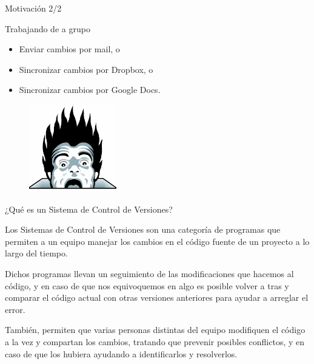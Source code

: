 \documentclass{beamer}
\begin{document}
\begin{frame}{Motivación 2/2}

    \begin{block}{Trabajando de a grupo}
        \begin{itemize}
            \item Enviar cambios por mail, o
            \pause
            \item Sincronizar cambios por Dropbox, o
            \pause
            \item Sincronizar cambios por Google Docs.
        \end{itemize}
    \end{block}

    \pause
    \begin{figure}[ht]
        \begin{center}
            \includegraphics[height=1.5in]{images/horror.png}
        \end{center}
    \end{figure}

\end{frame}

\begin{frame}{¿Qué es un Sistema de Control de Versiones?}

	\begin{block}{}
		Los Sistemas de Control de Versiones son una categoría de programas que permiten a un equipo manejar los cambios en el código fuente de un proyecto a lo largo del tiempo.

		Dichos programas llevan un seguimiento de las modificaciones que hacemos al código, y en caso de que nos equivoquemos en algo es posible volver a tras y comparar el código actual con otras versiones anteriores para ayudar a arreglar el error.

		También, permiten que varias personas distintas del equipo modifiquen el código a la vez y compartan los cambios, tratando que prevenir posibles conflictos, y en caso de que los hubiera ayudando a identificarlos y resolverlos.

	\end{block}

\end{frame}
\end{document}
